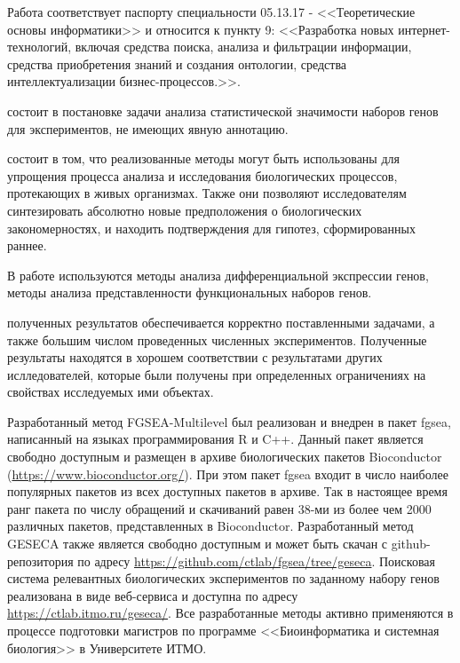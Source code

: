 {\passport} Работа соответствует паспорту специальности 05.13.17 - <<Теоретические основы информатики>> и относится к пункту 9: <<Разработка новых интернет-технологий, включая средства поиска, анализа и фильтрации информации, средства приобретения знаний и создания онтологии, средства интеллектуализации бизнес-процессов.>>.

{\theorinfluence} состоит в постановке задачи анализа статистической значимости наборов генов для экспериментов, не имеющих явную аннотацию.

{\influence} состоит в том, что реализованные методы могут быть использованы для упрощения процесса анализа и исследования биологических процессов, протекающих в живых организмах. 
Также они позволяют исследователям синтезировать абсолютно новые предположения о биологических закономерностях, и находить подтверждения для гипотез, сформированных раннее. 

{\methods} В работе используются методы анализа дифференциальной экспрессии генов, методы анализа представленности функциональных наборов генов.



{\reliability} полученных результатов обеспечивается корректно поставленными задачами, а также большим числом проведенных численных экспериментов.
Полученные результаты находятся в хорошем соответствии с результатами других ислледователей, которые были получены при определенных ограничениях на свойствах исследуемых ими объектах.

{\integration} Разработанный метод FGSEA-Multilevel был реализован и внедрен в пакет fgsea, написанный на языках программирования R и C++. 
Данный пакет является свободно доступным и размещен в архиве биологических пакетов Bioconductor (\url{https://www.bioconductor.org/}).
При этом пакет fgsea входит в число наиболее популярных пакетов из всех доступных пакетов в архиве.
Так в настоящее время ранг пакета по числу обращений и скачиваний равен 38-ми из более чем 2000 различных пакетов, представленных в Bioconductor.
Разработанный метод GESECA также является свободно доступным и может быть скачан с github-репозитория по адресу \url{https://github.com/ctlab/fgsea/tree/geseca}. Поисковая система релевантных биологических экспериментов по заданному набору генов реализована в виде веб-сервиса и доступна по адресу \url{https://ctlab.itmo.ru/geseca/}. Все разработанные методы активно применяются в процессе подготовки магистров по программе <<Биоинформатика и системная биология>> в Университете ИТМО.


